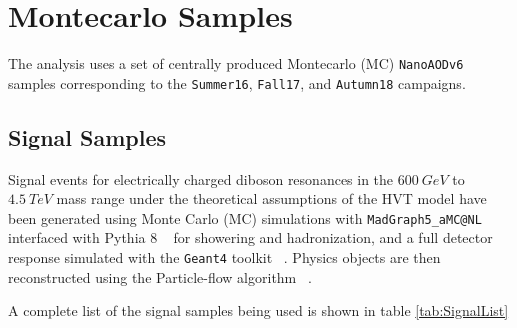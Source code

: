 \section{Montecarlo Samples}

The analysis uses a set of centrally produced Montecarlo (MC) \verb|NanoAODv6|
samples corresponding to the \verb|Summer16|, \verb|Fall17|, and \verb|Autumn18|
campaigns.


\subsection {Signal Samples}

Signal events for electrically charged diboson resonances in the $600~GeV$
to $4.5~TeV$ mass range under the theoretical assumptions of the HVT model
have been generated using Monte Carlo (MC) simulations with \verb|MadGraph5_aMC@NL| ~\cite{madgraph}
interfaced with Pythia 8 ~\cite{pythia} for showering and hadronization, and a
full detector response simulated with the \verb|Geant4| toolkit ~\cite{geant4}.
Physics objects are then reconstructed using the Particle-flow
algorithm ~\cite{particleflow}.

A complete list of the signal samples being used is shown in
table \ref{tab:SignalList}


